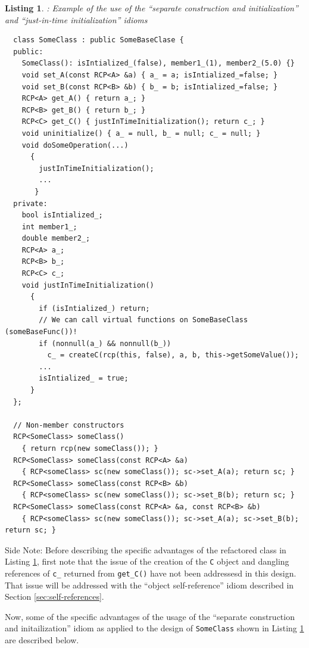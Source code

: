 \documentclass[pdf,ps2pdf,11pt]{SANDreport}
\newtheorem{listing}{Listing}
\begin{document}
\begin{listing}: Example of the use of the ``separate construction and
initialization'' and ``just-in-time initialization'' idioms  \\
\label{listing:sci:SomeClass-refactored}
{\small\begin{verbatim}
  class SomeClass : public SomeBaseClase {
  public:
    SomeClass(): isIntialized_(false), member1_(1), member2_(5.0) {}
    void set_A(const RCP<A> &a) { a_ = a; isIntialized_=false; }
    void set_B(const RCP<B> &b) { b_ = b; isIntialized_=false; }
    RCP<A> get_A() { return a_; }
    RCP<B> get_B() { return b_; }
    RCP<C> get_C() { justInTimeInitialization(); return c_; }
    void uninitialize() { a_ = null, b_ = null; c_ = null; }
    void doSomeOperation(...)
      {
        justInTimeInitialization();
        ...
       }
  private:
    bool isIntialized_;
    int member1_;
    double member2_;
    RCP<A> a_;
    RCP<B> b_;
    RCP<C> c_;
    void justInTimeInitialization()
      {
        if (isIntialized_) return;
        // We can call virtual functions on SomeBaseClass (someBaseFunc())!
        if (nonnull(a_) && nonnull(b_))
          c_ = createC(rcp(this, false), a, b, this->getSomeValue());
        ...
        isIntialized_ = true;
      }
  };

  // Non-member constructors
  RCP<SomeClass> someClass()
    { return rcp(new someClass()); }
  RCP<SomeClass> someClass(const RCP<A> &a)
    { RCP<someClass> sc(new someClass()); sc->set_A(a); return sc; }
  RCP<SomeClass> someClass(const RCP<B> &b)
    { RCP<someClass> sc(new someClass()); sc->set_B(b); return sc; }
  RCP<SomeClass> someClass(const RCP<A> &a, const RCP<B> &b)
    { RCP<someClass> sc(new someClass()); sc->set_A(a); sc->set_B(b);  return sc; }
\end{verbatim}}
\end{listing}


Side Note: Before describing the specific advantages of the refactored
class in Listing {}\ref{listing:sci:SomeClass-refactored}, first
note that the issue of the creation of the {}\texttt{C} object and
dangling references of {}\texttt{c\_} returned from
{}\texttt{get\_C()} have not been addressesd in this design.  That
issue will be addressed with the ``object self-reference'' idiom
described in Section {}\ref{sec:self-references}.

Now, some of the specific advantages of the usage of the ``separate
construction and initailization'' idiom as applied to the design of
{}\texttt{SomeClass} shown in Listing
{}\ref{listing:sci:SomeClass-refactored} are described below.
\end{document}
